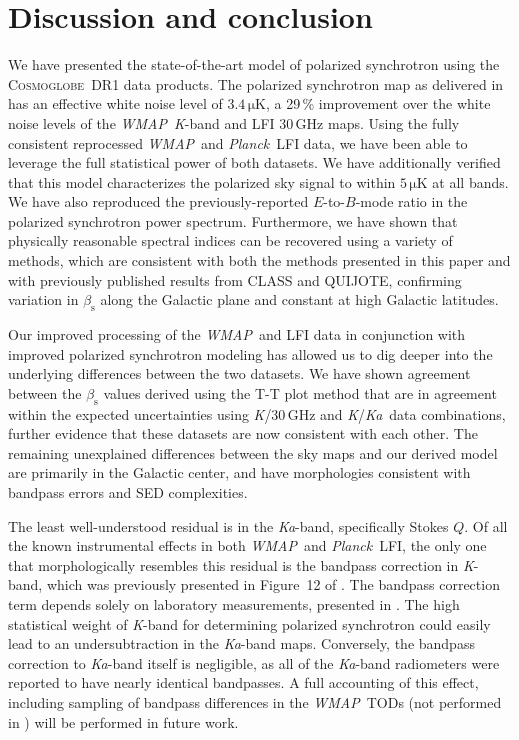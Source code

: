 \documentclass[twocolumn]{../../common/aa}
\def\WMAP{\emph{WMAP}}
\def\Planck{\emph{Planck}}
\newcommand{\cosmoglobe}{\textsc{Cosmoglobe}}
\newcommand{\K}[0]{\textit K}
\newcommand{\Ka}[0]{\textit{Ka}}
\begin{document}
\section{Discussion and conclusion}
\label{sec:conclusion}

We have presented the state-of-the-art model of polarized synchrotron using the \cosmoglobe\ DR1 data products. The polarized synchrotron map as delivered in \citet{watts2023_dr1} has an effective white noise level of $3.4\,\mathrm{\mu K}$, a 29\,\% improvement over the white noise levels of the \WMAP\ \K-band and LFI 30\,GHz maps. Using the fully consistent reprocessed \WMAP\ and \Planck\ LFI data, we have been able to leverage the full statistical power of both datasets. We have additionally verified that this model characterizes the polarized sky signal to within $5\,\mathrm{\mu K}$ at all bands. We have also reproduced the previously-reported $E$-to-$B$-mode ratio in the polarized synchrotron power spectrum. Furthermore, we have shown that physically reasonable spectral indices can be recovered using a variety of methods, which are consistent with both the methods presented in this paper and with previously published results from CLASS and QUIJOTE, confirming variation in $\beta_\mathrm s$ along the Galactic plane and constant at high Galactic latitudes.


Our improved processing of the \WMAP\ and LFI data in conjunction with improved polarized synchrotron modeling has allowed us to dig deeper into the underlying differences between the two datasets. We have shown agreement between the $\beta_\mathrm s$ values derived using the T-T plot method that are in agreement within the expected uncertainties using \K/30\,GHz and \K/\Ka\ data combinations, further evidence that these datasets are now consistent with each other. The remaining unexplained differences between the sky maps and our derived model are primarily in the Galactic center, and have morphologies consistent with bandpass errors and SED complexities.


The least well-understood residual is in the \Ka-band, specifically Stokes $Q$. Of all the known instrumental effects in both \WMAP\ and \Planck\ LFI, the only one that morphologically resembles this residual is the bandpass correction in \K-band, which was previously presented in Figure~12 of \citet{watts2023_dr1}. The bandpass correction term depends solely on laboratory measurements, presented in \citet{jarosik2003:MAP}. The high statistical weight of \K-band for determining polarized synchrotron could easily lead to an undersubtraction in the \Ka-band maps. Conversely, the bandpass correction to \Ka-band itself is negligible, as all of the \Ka-band radiometers were reported to have nearly identical bandpasses. A full accounting of this effect, including sampling of bandpass differences in the \WMAP\ TODs (not performed in \citealt{watts2023_dr1}) will be performed in future work.
\end{document}

